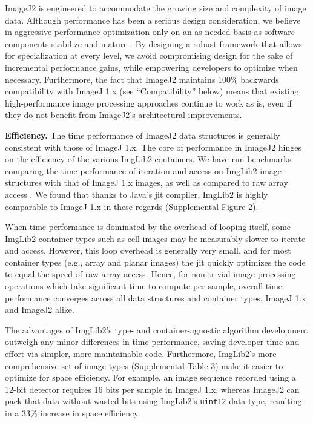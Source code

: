 \documentclass{bmcart}
\begin{document}
ImageJ2 is engineered to accommodate the growing size and complexity of image
data. Although performance has been a serious design consideration, we believe
in aggressive performance optimization only on an as-needed basis as software
components stabilize and mature \cite{premature_optimization}. By designing a
robust framework that allows for specialization at every level, we avoid
compromising design for the sake of incremental performance gains, while
empowering developers to optimize when necessary. Furthermore, the fact that
ImageJ2 maintains 100\% backwards compatibility with ImageJ 1.x (see
``Compatibility'' below) means that existing high-performance image processing
approaches continue to work as is, even if they do not benefit from ImageJ2's
architectural improvements.

\textbf{Efficiency.} The time performance of ImageJ2 data structures is
generally consistent with those of ImageJ 1.x. The core of performance in
ImageJ2 hinges on the efficiency of the various ImgLib2 containers. We have run
benchmarks comparing the time performance of iteration and access on ImgLib2
image structures with that of ImageJ 1.x images, as well as compared to raw
array access \cite{imglib2_benchmarks}. We found that thanks to Java's
\acrfull{jit} compiler, ImgLib2 is highly comparable to ImageJ 1.x in these
regards (Supplemental Figure 2).

When time performance is dominated by the overhead of looping itself, some
ImgLib2 container types such as cell images may be measurably slower to iterate
and access. However, this loop overhead is generally very small, and for most
container types (e.g., array and planar images) the \acrshort{jit} quickly
optimizes the code to equal the speed of raw array access. Hence, for
non-trivial image processing operations which take significant time to compute
per sample, overall time performance converges across all data structures and
container types, ImageJ 1.x and ImageJ2 alike.

The advantages of ImgLib2's type- and container-agnostic algorithm development
outweigh any minor differences in time performance, saving developer time and
effort via simpler, more maintainable code. Furthermore, ImgLib2's more
comprehensive set of image types (Supplemental Table 3) make it easier to
optimize for space efficiency. For example, an image sequence recorded using a
12-bit detector requires 16 bits per sample in ImageJ 1.x, whereas ImageJ2 can
pack that data without wasted bits using ImgLib2's \texttt{uint12} data type,
resulting in a 33\% increase in space efficiency.
\end{document}
